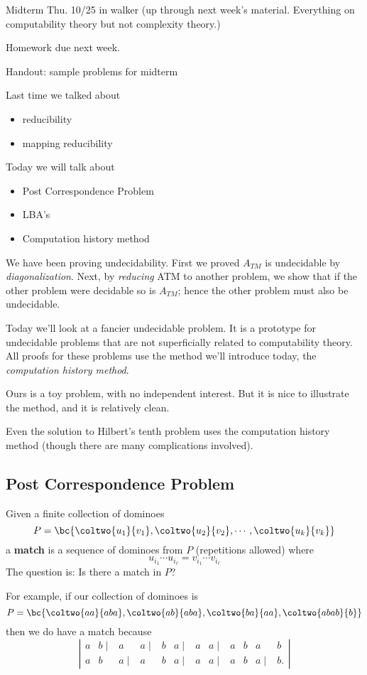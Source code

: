
Midterm Thu. 10/25 in walker (up through next week's material. Everything on computability theory but not complexity theory.)

Homework due next week.

Handout: sample problems for midterm

Last time we talked about
\begin{itemize}
\item
reducibility
\item mapping reducibility
\end{itemize}
Today we will talk about 
\begin{itemize}
\item
Post Correspondence Problem
\item
LBA's
\item 
Computation history method
\end{itemize}
We have been proving undecidability. First we proved $A_{TM}$ is undecidable by {\it diagonalization}. Next, by {\it reducing} ATM to another problem, we show that if the other problem were decidable so is $A_{TM}$; hence the other problem must also be undecidable.

Today we'll look at a fancier undecidable problem. It is a prototype for undecidable problems that are not superficially related to computability theory. All proofs for these problems use the method we'll introduce today, the {\it computation history method}.

Ours is a toy problem, with no independent interest. But it is nice to illustrate the method, and it is relatively clean. 

Even the solution to Hilbert's tenth problem uses the computation history method (though there are many complications involved).
\subsection{Post Correspondence Problem}
Given a finite collection of dominoes
\[
P=\bc{
\coltwo{u_1}{v_1},\coltwo{u_2}{v_2},\cdots,\coltwo{u_k}{v_k}
}
\]
a \textbf{match} is a sequence of dominoes from $P$ (repetitions allowed) where 
\[
u_{i_1}\cdots u_{i_{\ell}}=v_{i_1}\cdots v_{i_{\ell}}
\]
The question is: Is there a match in $P$?

For example, if our collection of dominoes is
\[
P=\bc{
\coltwo{aa}{aba},\coltwo{ab}{aba},\coltwo{ba}{aa},\coltwo{abab}{b}
}
\]
then we do have a match because 
\[
\left|
\begin{array}{cccccccccccc}
a&b\mid&a& a\mid&b&a\mid&a&a\mid&a&b&a&b\\
a&b&a\mid&a&b&a\mid&a&a\mid&a&b&a\mid&b.
\end{array}
\right|
\]

